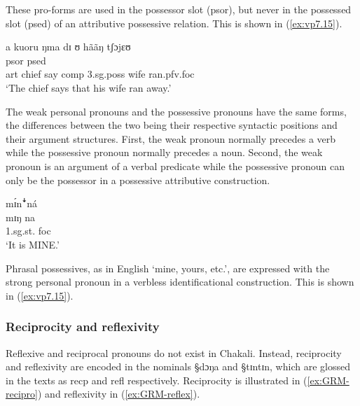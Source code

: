 These pro-forms are used in the possessor slot ({\sc psor}), but never in
the possessed slot ({\sc psed}) of an attributive possessive relation. This
is shown in (\ref{ex:vp7.15}). 

\begin{exe}
\ex\label{ex:vp7.15}
\glll a kuoru ŋma dɪ ʊ hããŋ tʃɔjɛʊ \\
{} {} {}  {} {\sc psor} {\sc psed}  {}\\
     {\sc art} chief say {\sc comp} {3.sg.poss} wife ran.{\sc pfv.foc}   \\
\glt  `The chief says that his wife ran away.' 
\end{exe}

The  weak personal pronouns and the possessive pronouns have the same forms, the
differences between the two being their respective syntactic positions and their
argument structures. First, the weak pronoun normally precedes a verb while the
possessive pronoun normally precedes a noun. Second, the weak pronoun is an
argument of a verbal predicate while the possessive pronoun can only be the
possessor in a possessive attributive construction. 


\begin{exe}
\ex\label{ex:vp7.15}
\glll                                                                    
{\I mɪ́nꜜná}  \\
 mɪŋ na\\
{\sc 1.sg.st.} {\sc foc}\\

\glt  `It is MINE.' 
\end{exe}


Phrasal possessives, as in English `mine, yours, etc.', are expressed with the
strong personal pronoun  in a verbless identificational
construction. This is shown in (\ref{ex:vp7.15}).




\subsubsection{Reciprocity and reflexivity}
\label{sec:GRM-recipro-reflex}


Reflexive and reciprocal pronouns do not exist in Chakali.  Instead,
reciprocity and reflexivity  are
encoded in  the nominals {\S dɔŋa}    and {\S tɪntɪn}, which are glossed in the
texts as {\sc
recp}  and {\sc refl} respectively.   Reciprocity is illustrated in
(\ref{ex:GRM-recipro}) and reflexivity in (\ref{ex:GRM-reflex}). 

